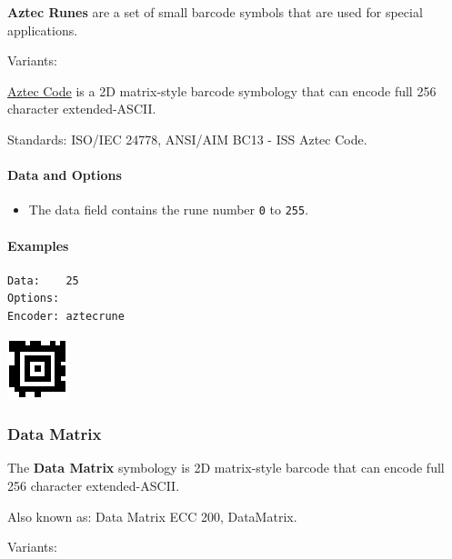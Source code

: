 \textbf{Aztec Runes} are a set of small barcode symbols that are used
for special applications.

Variants:

\protect\hyperlink{aztec-code}{Aztec Code} is a 2D matrix-style barcode
symbology that can encode full 256 character extended-ASCII.

Standards: ISO/IEC 24778, ANSI/AIM BC13 - ISS Aztec Code.

\hypertarget{data-and-options-8}{%
\paragraph{Data and Options}\label{data-and-options-8}}

\begin{itemize}
\tightlist
\item
  The data field contains the rune number \texttt{0} to \texttt{255}.
\end{itemize}

\hypertarget{examples-5}{%
\paragraph{Examples}\label{examples-5}}

\begin{verbatim}
Data:    25
Options: 
Encoder: aztecrune
\end{verbatim}

\includegraphics{images/aztec-3.eps}

\hypertarget{data-matrix}{%
\subsubsection{Data Matrix}\label{data-matrix}}

The \textbf{Data Matrix} symbology is 2D matrix-style barcode that can
encode full 256 character extended-ASCII.

Also known as: Data Matrix ECC 200, DataMatrix.

Variants:

